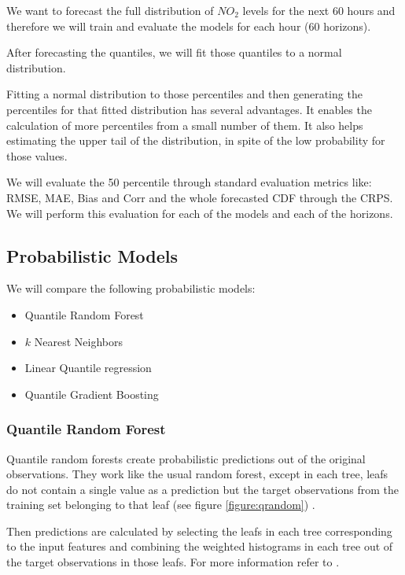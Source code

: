 \documentclass[a4paper,twocolumn,5p]{elsarticle}
\begin{document}
We want to forecast the full distribution of $NO_2$ levels
for the next 60 hours and therefore we will train and evaluate
the models for each hour (60 horizons).

After forecasting the quantiles, we will fit those quantiles to a normal distribution.

Fitting a normal distribution to those percentiles and then generating the 
percentiles for that fitted distribution has several advantages. It 
enables the calculation of more percentiles
from a small number of them.
It also helps estimating the upper tail of the distribution, in spite of the 
low probability for 
those values.

We will evaluate the 50 percentile through standard evaluation metrics like: RMSE, MAE, 
Bias and Corr 
and the whole forecasted CDF through the CRPS. We will perform
this evaluation for each of the models and each of the horizons.

\subsection{Probabilistic Models}
\label{sec:models}

We will compare the following probabilistic models:
\begin{itemize}
  \item Quantile Random Forest
  \item $k$ Nearest Neighbors
  \item Linear Quantile regression
  \item Quantile Gradient Boosting 
\end{itemize}

\subsubsection{Quantile Random Forest}

Quantile random forests create probabilistic predictions out of 
the original observations. They work like the usual random forest, 
except in each tree,
leafs do not contain a single value as a prediction but the target observations 
from the training set 
belonging to that leaf (see figure \ref{figure:qrandom}) . 

Then predictions are calculated by selecting the leafs in each tree
corresponding to the input features and combining the weighted 
histograms in each tree out of the target observations in those leafs. 
For more information refer to 
\cite{quantregforests}.
\end{document}
